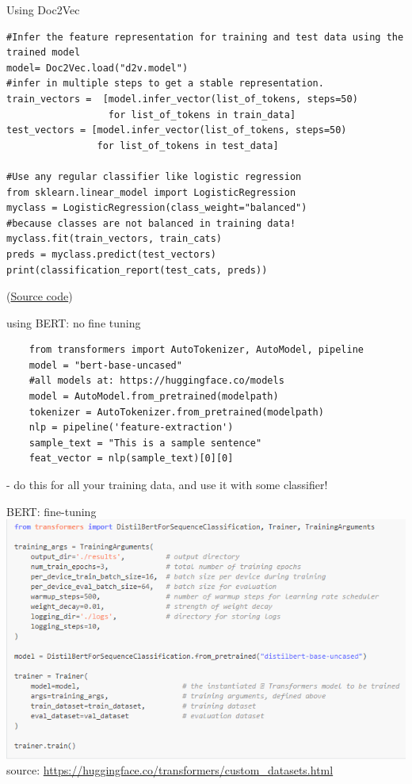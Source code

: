 \documentclass{beamer}
\begin{document}
\begin{frame}[fragile]{Using Doc2Vec}
    \tiny
    \begin{verbatim}
#Infer the feature representation for training and test data using the trained model
model= Doc2Vec.load("d2v.model")
#infer in multiple steps to get a stable representation. 
train_vectors =  [model.infer_vector(list_of_tokens, steps=50) 
                  for list_of_tokens in train_data]
test_vectors = [model.infer_vector(list_of_tokens, steps=50) 
                for list_of_tokens in test_data]

#Use any regular classifier like logistic regression
from sklearn.linear_model import LogisticRegression
myclass = LogisticRegression(class_weight="balanced") 
#because classes are not balanced in training data!
myclass.fit(train_vectors, train_cats)
preds = myclass.predict(test_vectors)
print(classification_report(test_cats, preds))
    \end{verbatim}
    (\href{https://github.com/practical-nlp/practical-nlp/blob/master/Ch4/02_Doc2Vec_Example.ipynb}{Source code})
\end{frame}

\begin{frame}[fragile]{using BERT: no fine tuning}
\tiny
    \begin{verbatim}
    from transformers import AutoTokenizer, AutoModel, pipeline
    model = "bert-base-uncased" 
    #all models at: https://huggingface.co/models
    model = AutoModel.from_pretrained(modelpath)
    tokenizer = AutoTokenizer.from_pretrained(modelpath)
    nlp = pipeline('feature-extraction')
    sample_text = "This is a sample sentence"
    feat_vector = nlp(sample_text)[0][0]
    \end{verbatim}
    - do this for all your training data, and use it with some classifier!
\end{frame}

\begin{frame}{BERT: fine-tuning}
    \includegraphics[width=\textwidth]{figures/huggingfacetuning.PNG}
    \tiny source: \url{https://huggingface.co/transformers/custom_datasets.html}
\end{frame}
\end{document}
